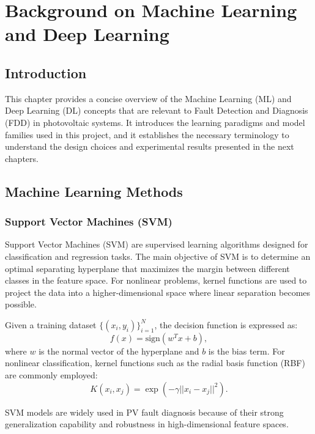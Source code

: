 \chapter{Background on Machine Learning and Deep Learning}
\label{ch:ml-methods}

\section{Introduction}

This chapter provides a concise overview of the Machine Learning (ML) and Deep Learning (DL) concepts that are relevant to Fault Detection and Diagnosis (FDD) in photovoltaic systems. It introduces the learning paradigms and model families used in this project, and it establishes the necessary terminology to understand the design choices and experimental results presented in the next chapters.

\section{Machine Learning Methods}
\label{sec:ml_background}

\subsection{Support Vector Machines (SVM)}

Support Vector Machines (SVM) are supervised learning algorithms designed for classification and regression tasks. The main objective of SVM is to determine an optimal separating hyperplane that maximizes the margin between different classes in the feature space. For nonlinear problems, kernel functions are used to project the data into a higher-dimensional space where linear separation becomes possible.

Given a training dataset $\{(x_i,y_i)\}_{i=1}^{N}$, the decision function is expressed as:
\begin{equation}
f(x)=\text{sign}(w^Tx+b),
\end{equation}
where $w$ is the normal vector of the hyperplane and $b$ is the bias term. For nonlinear classification, kernel functions such as the radial basis function (RBF) are commonly employed:
\begin{equation}
K(x_i,x_j)=\exp(-\gamma ||x_i-x_j||^2).
\end{equation}

SVM models are widely used in PV fault diagnosis because of their strong generalization capability and robustness in high-dimensional feature spaces.

